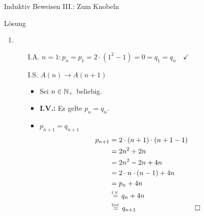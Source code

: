 \begin{frame}{Induktiv Beweisen III.: Zum Knobeln}
	\begin{block}{Lösung}
	\begin{enumerate}
		\setcounter{enumi}{\value{kevin}}
		\item \begin{itemize}
			\item[I.A.] $n=1: p_n = p_1 = 2 \cdot (1^2 -1 ) = 0 = q_1 = q_n \quad \checkmark$ \\[1em]
			\item[I.S.] $A(n) \rightarrow A(n+1)$ %
				\begin{itemize}
					\item Sei $n \in \mathbb{N}_{+}$ beliebig.
					\item \textbf{I.V.:} Es gelte $p_n = q_n$.
					\item \zz $p_{n+1}=q_{n+1}$
						\begin{align*}
							p_{n+1} &= 2 \cdot (n+1) \cdot (n+1-1) \\
									&= 2n^2 + 2n \\
									&= 2n^2 -2n + 4n \\
									&= 2 \cdot n \cdot (n-1) + 4n \\
									&= p_n + 4n \\
									&\eqtext{I.V.} q_n + 4n \\
									&\eqtext{Def.} q_{n+1} & \qedwhite{}
						\end{align*}
				\end{itemize}
		\end{itemize}
	\end{enumerate}		
	\end{block}
\end{frame}